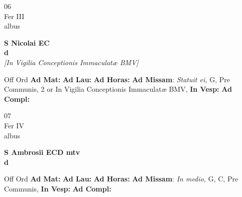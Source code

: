 \documentclass[10pt, openany]{book}
\begin{document}
        \begin{center}
            \begin{minipage}{3.5in}
                \vspace{2em}
                \begin{minipage}{0.5in}
                    {\Huge 06} \\
                    {\normalsize Fer III} \\
                    {\normalsize albus}
                \end{minipage}
                \begin{minipage}{3.0in}
                    \textbf{ \large S Nicolai EC \\
                    \textnormal{\normalsize d}} \\ \textit{[In Vigilia Conceptionis Immaculatæ BMV]} \\ 
                \end{minipage}
                \begin{justify}Off Ord
                    \textbf{Ad Mat: }
                    \textbf{Ad Lau: }
                    \textbf{Ad Horas: }\textbf{Ad Missam}: \textit{Statuit ei,} G, Pre Communis, 2 or In Vigilia Conceptionis Immaculatæ BMV,  
                    \textbf{In Vesp: }
                    \textbf{Ad Compl: }
                \end{justify}
            \end{minipage}
        \end{center}
    
        \begin{center}
            \begin{minipage}{3.5in}
                \vspace{2em}
                \begin{minipage}{0.5in}
                    {\Huge 07} \\
                    {\normalsize Fer IV} \\
                    {\normalsize albus}
                \end{minipage}
                \begin{minipage}{3.0in}
                    \textbf{ \large S Ambrosii ECD mtv \\
                    \textnormal{\normalsize d}} \\ 
                \end{minipage}
                \begin{justify}Off Ord
                    \textbf{Ad Mat: }
                    \textbf{Ad Lau: }
                    \textbf{Ad Horas: }\textbf{Ad Missam}: \textit{In medio,} G, C, Pre Communis,  
                    \textbf{In Vesp: }
                    \textbf{Ad Compl: }
                \end{justify}
            \end{minipage}
        \end{center}
    
\end{document}
